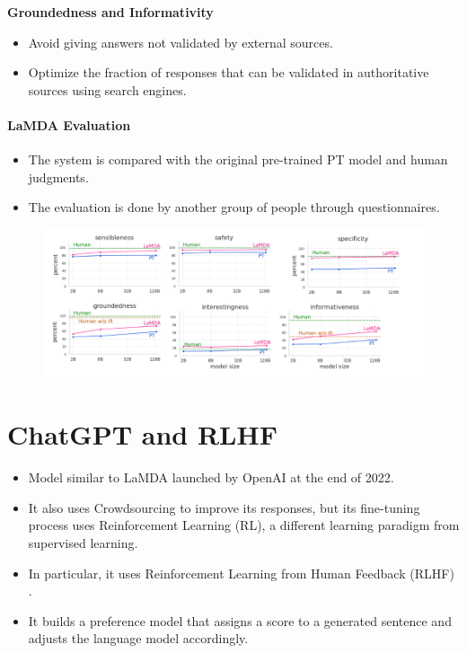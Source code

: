 \textbf{Groundedness and Informativity}
\begin{itemize}
\item Avoid giving answers not validated by external sources.
\item Optimize the fraction of responses that can be validated in authoritative sources using search engines.

\end{itemize}

\paragraph{LaMDA Evaluation}
\begin{itemize}
\item The system is compared with the original pre-trained PT model and human judgments.
\item The evaluation is done by another group of people through questionnaires.
\end{itemize}
 \begin{figure}[h]
        	\includegraphics[scale = 0.45]{pics/lambdaresults.png}
        \end{figure}



\section{ChatGPT and RLHF}
\begin{itemize}
\item Model similar to LaMDA launched by OpenAI at the end of 2022.
\item It also uses Crowdsourcing to improve its responses, but its fine-tuning process uses Reinforcement Learning (RL), a different learning paradigm from supervised learning.
\item In particular, it uses Reinforcement Learning from Human Feedback (RLHF) \cite{ouyang2022training}.
\item It builds a preference model that assigns a score to a generated sentence and adjusts the language model accordingly.
\end{itemize}

